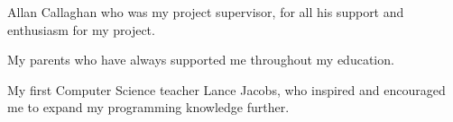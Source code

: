 Allan Callaghan who was my project supervisor, for all his support and enthusiasm for my project.

My parents who have always supported me throughout my education.

My first Computer Science teacher Lance Jacobs, who inspired and encouraged me to expand my programming knowledge further.
